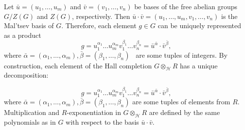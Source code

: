 \documentclass[11pt]{article}
\theoremstyle{definition}
\begin{document}
Let $\bar u = (u_1, \ldots,u_m)$ and $\bar v = (v_1, \ldots,v_n)$ be bases of the free abelian groups $G/Z(G)$ and $Z(G)$, respectively. Then $\bar u \cdot \bar v = (u_1, \ldots,u_m,v_1, \ldots,v_n)$ is the Mal'tsev basis of $G$. Therefore, each element $g \in G$ can be uniquely represented as a product
$$
g = u_1^{\alpha_1} \ldots u_m^{\alpha_m}v_1^{\beta_1} \ldots v_n^{\beta_n} = \bar u^{\bar\alpha} \cdot \bar v^{\bar \beta},
$$
where $\bar \alpha = (\alpha_1, \ldots,\alpha_m), \bar \beta = (\beta_1, \ldots,\beta_n)$~ are some tuples of integers. By construction, each element of the Hall completion $G \otimes_{\mathcal{H}} R$ has a unique decomposition:

$$
g = u_1^{\alpha_1} \ldots u_m^{\alpha_m}v_1^{\beta_1} \ldots v_n^{\beta_n} = \bar u^{\bar\alpha} \cdot \bar v^{\bar \beta},
$$
where $\bar \alpha = (\alpha_1, \ldots,\alpha_m), \bar \beta = (\beta_1, \ldots,\beta_n)$ are some tuples of elements from $R$. Multiplication and $R$-exponentiation in
$G \otimes_{\mathcal{H}} R$ are defined by the same polynomials as in $G$ with respect to the basis $\bar u \cdot \bar v$.
\end{document}
